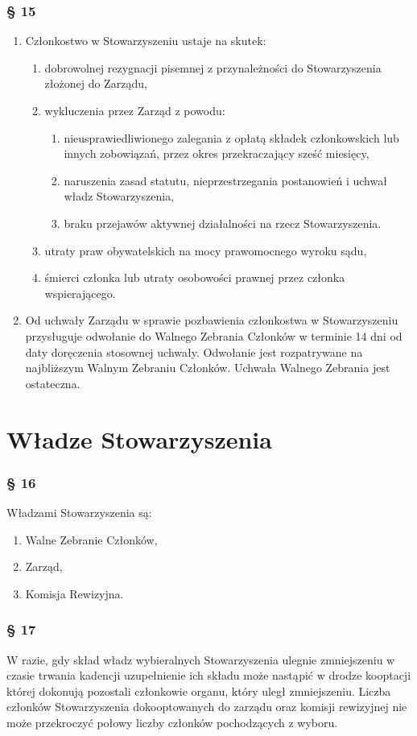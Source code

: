 \documentclass{article}
\newcommand{\myparagraph}[1]{\subsubsection*{#1}}
\begin{document}
\myparagraph{§ 15}
\begin{enumerate}
\item
  Członkostwo w Stowarzyszeniu ustaje na skutek:
  \begin{enumerate}
  \def\labelenumii{\alph{enumii}.}
  \item
    dobrowolnej rezygnacji pisemnej z przynależności do Stowarzyszenia złożonej do Zarządu,
  \item
    wykluczenia przez Zarząd z powodu:
    \begin{enumerate}
    \def\labelenumiii{\roman{enumiii}.}
    \item
      nieusprawiedliwionego zalegania z opłatą składek członkowskich lub innych zobowiązań, przez okres przekraczający sześć miesięcy,
    \item
      naruszenia zasad statutu, nieprzestrzegania postanowień i uchwał władz Stowarzyszenia,
    \item
      braku przejawów aktywnej działalności na rzecz Stowarzyszenia.
    \end{enumerate}
  \item
    utraty praw obywatelskich na mocy prawomocnego wyroku sądu,
  \item
    śmierci członka lub utraty osobowości prawnej przez członka
    wspierającego.
  \end{enumerate}
\item
  Od uchwały Zarządu w sprawie pozbawienia członkostwa w Stowarzyszeniu przysługuje odwołanie do Walnego Zebrania Członków w terminie 14 dni od daty doręczenia stosownej uchwały. Odwołanie jest rozpatrywane na najbliższym Walnym Zebraniu Członków. Uchwała Walnego Zebrania jest ostateczna.
\end{enumerate}

\section{Władze Stowarzyszenia}
\myparagraph{§ 16}
Władzami Stowarzyszenia są:
\begin{enumerate}
\item
  Walne Zebranie Członków,
\item
  Zarząd,
\item
  Komisja Rewizyjna.
\end{enumerate}

\myparagraph{§ 17}
W razie, gdy skład władz wybieralnych Stowarzyszenia ulegnie zmniejszeniu w czasie trwania kadencji uzupełnienie ich składu może nastąpić w drodze kooptacji której dokonują pozostali członkowie organu, który uległ zmniejszeniu. Liczba członków Stowarzyszenia dokooptowanych do zarządu oraz komisji rewizyjnej nie może przekroczyć połowy liczby członków pochodzących z wyboru.
\end{document}
